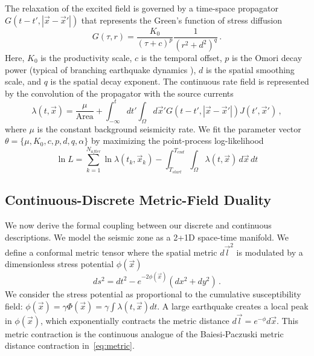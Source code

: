 \documentclass[twocolumn,amsmath,amssymb,aps,pre,superscriptaddress]{revtex4-1}
\begin{document}
The relaxation of the excited field is governed by a time-space propagator $G(t - t', |\vec{x} - \vec{x}'|)$ that represents the Green's function of stress diffusion
\begin{equation}
G(\tau, r) = \frac{K_0}{(\tau + c)^p} \frac{1}{(r^2 + d^2)^q}\,.
\label{eq:propagator}
\end{equation}
Here, $K_0$ is the productivity scale, $c$ is the temporal offset, $p$ is the Omori decay power (typical of branching earthquake dynamics \cite{Ogata1988}), $d$ is the spatial smoothing scale, and $q$ is the spatial decay exponent. The continuous rate field is represented by the convolution of the propagator with the source currents
\begin{equation}
\lambda(t, \vec{x}) = \frac{\mu}{\text{Area}} + \int_{-\infty}^t dt' \int_{\Omega} d\vec{x}' G(t - t', |\vec{x} - \vec{x}'|) J(t', \vec{x}') \,,
\label{eq:field_rate}
\end{equation}
where $\mu$ is the constant background seismicity rate. We fit the parameter vector $\theta = \{\mu, K_0, c, p, d, q, \alpha\}$ by maximizing the point-process log-likelihood
\begin{equation}
\ln L = \sum_{k=1}^{N_{after}} \ln \lambda(t_k, \vec{x}_k) - \int_{T_{start}}^{T_{end}} \int_{\Omega} \lambda(t, \vec{x}) \, d\vec{x} \, dt
\label{eq:mle}
\end{equation}

\subsection{Continuous-Discrete Metric-Field Duality}
\label{sec:duality}
We now derive the formal coupling between our discrete and continuous descriptions. We model the seismic zone as a 2+1D space-time manifold. We define a conformal metric tensor where the spatial metric $d\vec{l}^2$ is modulated by a dimensionless stress potential $\phi(\vec{x})$
\begin{equation}
ds^2 = dt^2 - e^{-2\phi(\vec{x})} (dx^2 + dy^2)\,.
\label{eq:conformal}
\end{equation}
We consider the stress potential as proportional to the cumulative susceptibility field: $\phi(\vec{x}) = \gamma \Phi(\vec{x}) = \gamma \int \lambda(t, \vec{x}) dt$. A large earthquake creates a local peak in $\phi(\vec{x})$, which exponentially contracts the metric distance $d\vec{l} = e^{-\phi} d\vec{x}$. This metric contraction is the continuous analogue of the Baiesi-Paczuski metric distance contraction in~\eqref{eq:metric}.
\end{document}
